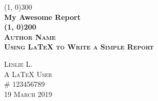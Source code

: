 \documentclass{article}
\begin{document}
\begin{titlepage}

\begin{center}
\line(1, 0){300}\\
[0.25in]
\huge\bfseries My Awesome Report\\
[2mm]
\line(1, 0){200}\\
[1.5cm]
\textsc{\LARGE Author Name}\\
[0.75cm]
\textsc{\Large Using LaTeX to Write a Simple Report}\\
[9cm]
\begin{flushright}
\textsc{\large Leslie L.\\
A LaTeX User\\
\# 123456789\\
19 March 2019\\}
\end{flushright}

\end{center}

\end{titlepage}
\end{document}
